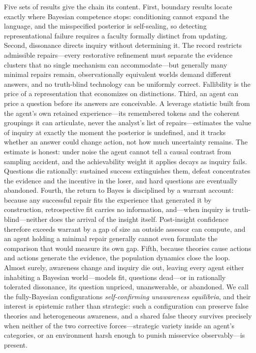 \documentclass[11pt]{article}
\theoremstyle{definition}
\begin{document}
Five sets of results give the chain its content.
First, boundary results locate exactly where Bayesian competence stops: conditioning cannot expand the language, and the misspecified posterior is self-sealing, so detecting representational failure requires a faculty formally distinct from updating.
Second, dissonance directs inquiry without determining it.
The record restricts admissible repairs---every restorative refinement must separate the evidence clusters that no single mechanism can accommodate---but generally many minimal repairs remain, observationally equivalent worlds demand different answers, and no truth-blind technology can be uniformly correct.
Fallibility is the price of a representation that economizes on distinctions.
Third, an agent can price a question before its answers are conceivable.
A leverage statistic built from the agent's own retained experience---its remembered tokens and the coherent groupings it can articulate, never the analyst's list of repairs---estimates the value of inquiry at exactly the moment the posterior is undefined, and it tracks whether an answer could change action, not how much uncertainty remains.
The estimate is honest: under noise the agent cannot tell a causal contrast from sampling accident, and the achievability weight it applies decays as inquiry fails.
Questions die rationally: sustained success extinguishes them, defeat concentrates the evidence and the incentive in the loser, and hard questions are eventually abandoned.
Fourth, the return to Bayes is disciplined by a warrant account: because any successful repair fits the experience that generated it by construction, retrospective fit carries no information, and---when inquiry is truth-blind---neither does the arrival of the insight itself.
Post-insight confidence therefore exceeds warrant by a gap of size an outside assessor can compute, and an agent holding a minimal repair generally cannot even formulate the comparison that would measure its own gap.
Fifth, because theories cause actions and actions generate the evidence, the population dynamics close the loop.
Almost surely, awareness change and inquiry die out, leaving every agent either inhabiting a Bayesian world---models fit, questions dead---or in rationally tolerated dissonance, its question unpriced, unanswerable, or abandoned.
We call the fully-Bayesian configurations \emph{self-confirming unawareness equilibria}, and their interest is epistemic rather than strategic: such a configuration can preserve false theories and heterogeneous awareness, and a shared false theory survives precisely when neither of the two corrective forces---strategic variety inside an agent's categories, or an environment harsh enough to punish misservice observably---is present.
\end{document}

